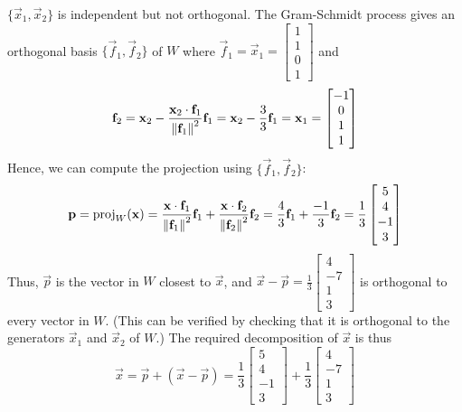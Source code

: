 \documentclass{ximera}
\begin{document}
\begin{example}
\begin{explanation}
  $\{\vec{x}_{1}, \vec{x}_{2}\}$ is independent but not orthogonal. The Gram-Schmidt process gives an orthogonal basis $\{\vec{f}_{1}, \vec{f}_{2}\}$ of $W$ where $\vec{f}_{1} = \vec{x}_{1} = \begin{bmatrix}
1 \\ 1 \\ 0 \\ 1
\end{bmatrix}$ and
\begin{equation*}
\mathbf{f}_{2} =\mathbf{x}_{2} - \frac{\mathbf{x}_{2} \cdot \mathbf{f}_{1}}{\left\lVert\mathbf{f}_{1}\right\rVert^2}\mathbf{f}_{1} = \mathbf{x}_{2} - \frac{3}{3}\mathbf{f}_{1} = \mathbf{x}_{1} = \begin{bmatrix}
-1 \\ 0 \\ 1 \\ 1
\end{bmatrix}
\end{equation*}
Hence, we can compute the projection using $\{\vec{f}_{1}, \vec{f}_{2}\}$:
\begin{equation*}
\mathbf{p} = \mbox{proj}_W(\mathbf{x}) =\frac{\mathbf{x} \cdot \mathbf{f}_{1}}{\left\lVert\mathbf{f}_{1}\right\rVert^2}\mathbf{f}_{1} + \frac{\mathbf{x} \cdot \mathbf{f}_{2}}{\left\lVert\mathbf{f}_{2}\right\rVert^2}\mathbf{f}_{2} = \frac{4}{3}\mathbf{f}_{1} + \frac{-1}{3}\mathbf{f}_{2} = \frac{1}{3}\begin{bmatrix}
5 \\ 4 \\ -1 \\ 3
\end{bmatrix}
\end{equation*}
Thus, $\vec{p}$ is the vector in $W$ closest to $\vec{x}$, and $\vec{x} - \vec{p} = \frac{1}{3}\begin{bmatrix}
4 \\ -7 \\ 1 \\ 3
\end{bmatrix}$ is orthogonal to every vector in $W$. (This can be verified by checking that it is orthogonal to the generators $\vec{x}_{1}$ and $\vec{x}_{2}$ of $W$.) The required decomposition of $\vec{x}$ is thus
\begin{equation*}
\vec{x} = \vec{p} + (\vec{x} - \vec{p}) = \frac{1}{3}\begin{bmatrix}
5 \\ 4 \\ -1 \\ 3
\end{bmatrix} + \frac{1}{3}\begin{bmatrix}
4 \\ -7 \\ 1 \\ 3
\end{bmatrix}
\end{equation*}
\end{explanation}
\end{example}
\end{document}

